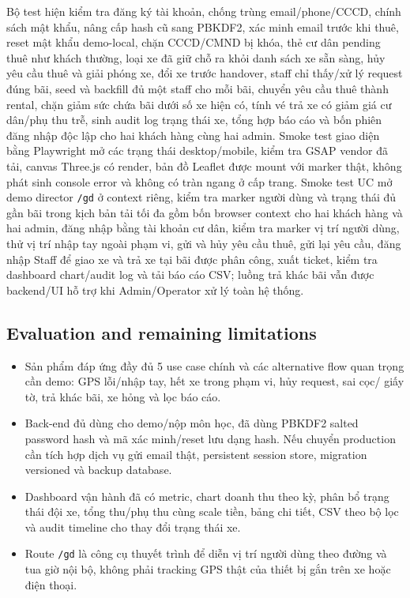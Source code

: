 Bộ test hiện kiểm tra đăng ký tài khoản, chống trùng email/phone/CCCD, chính
sách mật khẩu, nâng cấp hash cũ sang PBKDF2, xác minh email trước khi thuê,
reset mật khẩu demo-local, chặn CCCD/CMND bị khóa, thẻ cư dân pending thuê như
khách thường, loại xe đã giữ chỗ ra khỏi danh sách xe sẵn sàng, hủy yêu cầu
thuê và giải phóng xe, đổi xe trước handover, staff chỉ thấy/xử lý request đúng
bãi, seed và backfill đủ một staff cho mỗi bãi, chuyển yêu cầu thuê thành rental,
chặn giảm sức chứa bãi dưới số xe hiện
có, tính vé trả xe có giảm giá cư dân/phụ thu trễ, sinh audit log trạng thái xe,
tổng hợp báo cáo và bốn phiên đăng nhập độc lập cho hai khách hàng cùng hai
admin.
Smoke test giao diện bằng Playwright mở các trạng thái desktop/mobile, kiểm tra
GSAP vendor đã tải, canvas Three.js có render, bản đồ Leaflet được mount với marker
thật, không phát sinh console error và không có tràn ngang ở cấp trang.
Smoke test UC mở demo director \texttt{/gd} ở context riêng, kiểm tra marker người dùng và trạng
thái đủ gần bãi trong kịch bản tải tối đa gồm bốn browser context cho hai khách
hàng và hai admin, đăng nhập bằng tài khoản cư dân, kiểm tra marker vị trí người
dùng, thử vị trí nhập tay ngoài phạm vi, gửi và hủy yêu cầu thuê, gửi lại yêu
cầu, đăng nhập Staff để giao xe và trả xe tại bãi được phân công, xuất ticket,
kiểm tra dashboard chart/audit log và tải báo cáo CSV; luồng trả khác bãi vẫn
được backend/UI hỗ trợ khi Admin/Operator xử lý toàn hệ thống.

\subsection{Evaluation and remaining limitations}
\begin{itemize}
  \item Sản phẩm đáp ứng đầy đủ 5 use case chính và các alternative flow quan
  trọng cần demo: GPS lỗi/nhập tay, hết xe trong phạm vi, hủy request, sai cọc/
  giấy tờ, trả khác bãi, xe hỏng và lọc báo cáo.
  \item Back-end đủ dùng cho demo/nộp môn học, đã dùng PBKDF2 salted password
  hash và mã xác minh/reset lưu dạng hash. Nếu chuyển production cần tích hợp
  dịch vụ gửi email thật, persistent session store, migration versioned và
  backup database.
  \item Dashboard vận hành đã có metric, chart doanh thu theo kỳ, phân bổ trạng
  thái đội xe, tổng thu/phụ thu cùng scale tiền, bảng chi tiết, CSV theo bộ lọc và audit timeline
  cho thay đổi trạng thái xe.
  \item Route \texttt{/gd} là công cụ thuyết trình để diễn vị trí người dùng theo đường
  và tua giờ nội bộ, không phải tracking GPS thật của thiết bị gắn trên xe hoặc điện thoại.
\end{itemize}
